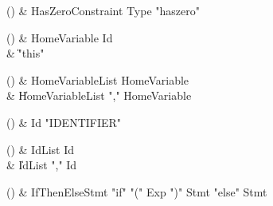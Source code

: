 \begin{bbgrammarappendix}

() & HasZeroConstraint \label{prod:HasZeroConstraint}  \: Type  \xcd"haszero"  \\


\end{bbgrammarappendix}

\begin{bbgrammarappendix}

() & HomeVariable \label{prod:HomeVariable}  \: Id  \\

 &    \| \xcd"this" \\

\end{bbgrammarappendix}

\begin{bbgrammarappendix}

() & HomeVariableList \label{prod:HomeVariableList}  \: HomeVariable  \\

 &    \| HomeVariableList \xcd"," HomeVariable \\

\end{bbgrammarappendix}

\begin{bbgrammarappendix}

() & Id \label{prod:Id}  \: \xcd"IDENTIFIER"   \\


\end{bbgrammarappendix}

\begin{bbgrammarappendix}

() & IdList \label{prod:IdList}  \: Id  \\

 &    \| IdList \xcd"," Id \\

\end{bbgrammarappendix}

\begin{bbgrammarappendix}

() & IfThenElseStmt \label{prod:IfThenElseStmt}  \: \xcd"if" \xcd"(" Exp \xcd")" Stmt  \xcd"else" Stmt   \\


\end{bbgrammarappendix}

